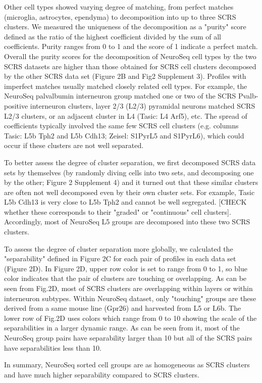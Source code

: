 Other cell types showed varying degree of matching, from perfect matches (microglia, astrocytes, ependyma) to decomposition into up to three SCRS clusters. We measured the uniqueness of the decomposition as a "purity" score defined as the ratio of the highest coefficient divided by the sum of all coefficients. Purity ranges from 0 to 1 and the score of 1 indicate a perfect match. Overall the purity scores for the decomposition of NeuroSeq cell types by the two SCRS datasets are higher than those obtained for SCRS cell clusters decomposed by the other SCRS data set (Figure 2B and Fig2 Supplement 3). Profiles with imperfect matches usually matched closely related cell types. For example, the NeuroSeq palvalbumin interneuron group matched one or two of the SCRS Pvalb-positive interneuron clusters, layer 2/3 (L2/3) pyramidal neurons matched SCRS L2/3 clusters, or an adjacent cluster in L4 (Tasic: L4 Arf5), etc. The spread of coefficients typically involved the same few SCRS cell clusters (e.g. columns Tasic: L5b Tph2 and L5b Cdh13; Zeisel: S1PyrL5 and S1PyrL6), which could occur if these clusters are not well separated. 

To better assess the degree of cluster separation, we first decomposed SCRS data sets by themselves (by randomly diving cells into two sets, and decomposing one by the other; Figure 2 Supplement 4) and it turned out that these similar clusters are often not well decomposed even by their own cluster sets. For example, Tasic L5b Cdh13 is very close to L5b Tph2 and cannot be well segregated. [CHECK whether these corresponds to their "graded" or "continuous" cell clusters]. Accordingly, most of NeuroSeq L5 groups are decomposed into these two SCRS clusters. 

To assess the degree of cluster separation more globally, we calculated the "separability" defined in Figure 2C for each pair of profiles in each data set (Figure 2D). In Figure 2D, upper row color is set to range from 0 to 1, so blue color indicates that the pair of clusters are touching or overlapping. As can be seen from Fig.2D, most of SCRS clusters are overlapping within layers or within interneuron subtypes. Within NeuroSeq dataset, only "touching" groups are these derived from a same mouse line (Gpr26) and harvested from L5 or L6b.  The lower row of Fig.2D uses colors which range from 0 to 10 showing the scale of the separabilities in a larger dynamic range. As can be seen from it, most of the NeuroSeq group pairs have separability larger than 10 but all of the SCRS pairs have separabilities less than 10.

In summary, NeuroSeq sorted cell groups are as homogeneous as SCRS clusters and have much higher separability compared to SCRS clusters. 










